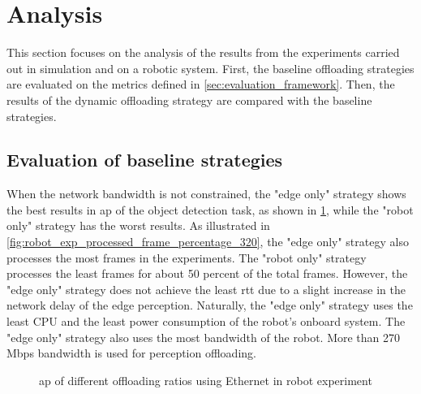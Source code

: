 \section{Analysis}\label{sec:analysis}

This section focuses on the analysis of the results from the experiments carried out in simulation and on a robotic system. First, the baseline offloading strategies are evaluated on the metrics defined in \cref{sec:evaluation_framework}. Then, the results of the dynamic offloading strategy are compared with the baseline strategies. 


\subsection{Evaluation of baseline strategies}

When the network bandwidth is not constrained, the "edge only" strategy shows the best results in \gls{ap} of the object detection task, as shown in \cref{fig:robot_exp_ap}, while the "robot only" strategy has the worst results. As illustrated in \cref{fig:robot_exp_processed_frame_percentage_320}, the "edge only" strategy also processes the most frames in the experiments. The "robot only" strategy processes the least frames for about 50 percent of the total frames. However, the "edge only" strategy does not achieve the least \gls{rtt} due to a slight increase in the network delay of the edge perception. Naturally, the "edge only" strategy uses the least CPU and the least power consumption of the robot's onboard system. The "edge only" strategy also uses the most bandwidth of the robot. More than 270 Mbps bandwidth is used for perception offloading. 

\begin{figure}
    \centering
    
    \caption{\gls{ap} of different offloading ratios using Ethernet in robot experiment}
    \label{fig:robot_exp_ap}
\end{figure}

